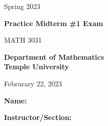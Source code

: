 \documentclass[12pt]{report}
\begin{document}
\begin{center}
\large{Spring 2023}
\end{center}

\vspace{20pt}

\begin{center}
\huge{\textbf{Practice Midterm \#1 Exam}}
\end{center}

\begin{center}
\Large{MATH 3031}
\end{center}

\begin{center}
\large{\textbf{Department of Mathematics \\ Temple University}}
\end{center}

\vspace{30pt}

\begin{center}
\large{Februrary 22, 2023}
\end{center}

\vspace{10pt}

\begin{center}
\large{\textbf{Name:} \hrulefill}
\end{center}

\begin{center}
\large{\textbf{Instructor/Section:} \hrulefill}
\end{center}




\vspace{30pt}
\end{document}
